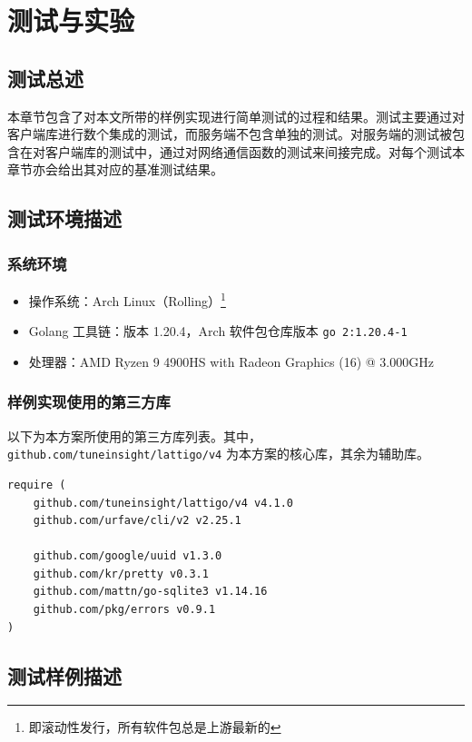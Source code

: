 \chapter{测试与实验}

\section{测试总述}
本章节包含了对本文所带的样例实现进行简单测试的过程和结果。测试主要通过对客户端库进行数个集成的测试，而服务端不包含单独的测试。对服务端的测试被包含在对客户端库的测试中，通过对网络通信函数的测试来间接完成。对每个测试本章节亦会给出其对应的基准测试结果。

\section{测试环境描述}

\subsection{系统环境}

\begin{itemize}
    \item 操作系统：Arch Linux（Rolling）\footnote{即滚动性发行，所有软件包总是上游最新的}
    \item Golang 工具链：版本 1.20.4，Arch 软件包仓库版本 \verb|go 2:1.20.4-1|
    \item 处理器：AMD Ryzen 9 4900HS with Radeon Graphics (16) @ 3.000GHz
\end{itemize}

\subsection{样例实现使用的第三方库}

以下为本方案所使用的第三方库列表。其中，\verb|github.com/tuneinsight/lattigo/v4| 为本方案的核心库，其余为辅助库。

\begin{verbatim}
require (
    github.com/tuneinsight/lattigo/v4 v4.1.0
    github.com/urfave/cli/v2 v2.25.1

    github.com/google/uuid v1.3.0
    github.com/kr/pretty v0.3.1
    github.com/mattn/go-sqlite3 v1.14.16
    github.com/pkg/errors v0.9.1
)
\end{verbatim}

\section{测试样例描述}

